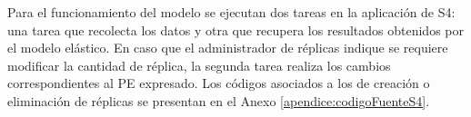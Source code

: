 %

Para el funcionamiento del modelo se ejecutan dos tareas en la aplicaci\'on de S4: una tarea que recolecta los datos y otra que recupera los resultados obtenidos por el modelo el\'astico. En caso que el administrador de r\'eplicas indique se requiere modificar la cantidad de r\'eplica, la segunda tarea realiza los cambios correspondientes al PE expresado. Los c\'odigos asociados a los de creaci\'on o eliminaci\'on de r\'eplicas se presentan en el Anexo \ref{apendice:codigoFuenteS4}.

